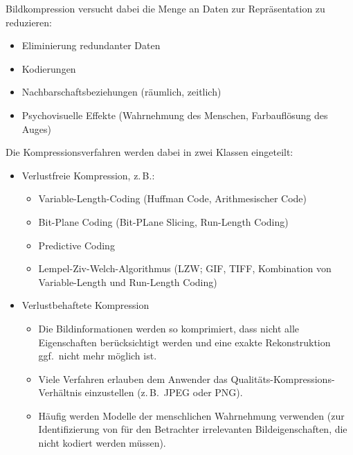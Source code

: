 \documentclass[a4paper, 11pt, accentcolor = tud3b]{tudreport}
\newcommand{\zB}{z.\,B.~}
\newcommand{\ggf}{ggf.~}
\begin{document}
			Bildkompression versucht dabei die Menge an Daten zur Repräsentation zu reduzieren:
			\begin{itemize}
				\item Eliminierung redundanter Daten
				\item Kodierungen
				\item Nachbarschaftsbeziehungen (räumlich, zeitlich)
				\item Psychovisuelle Effekte (Wahrnehmung des Menschen, Farbauflösung des Auges)
			\end{itemize}
			Die Kompressionsverfahren werden dabei in zwei Klassen eingeteilt:
			\begin{itemize}
				\item Verlustfreie Kompression, z.\,B.:
					\begin{itemize}
						\item Variable-Length-Coding (Huffman Code, Arithmesischer Code)
						\item Bit-Plane Coding (Bit-PLane Slicing, Run-Length Coding)
						\item Predictive Coding
						\item Lempel-Ziv-Welch-Algorithmus (LZW; GIF, TIFF, Kombination von Variable-Length und Run-Length Coding)
					\end{itemize}
				\item Verlustbehaftete Kompression
					\begin{itemize}
						\item Die Bildinformationen werden so komprimiert, dass nicht alle Eigenschaften berücksichtigt werden und eine exakte Rekonstruktion \ggf nicht mehr möglich ist.
						\item Viele Verfahren erlauben dem Anwender das Qualitäts-Kompressions-Verhältnis einzustellen (\zB JPEG oder PNG).
						\item Häufig werden Modelle der menschlichen Wahrnehmung verwenden (zur Identifizierung von für den Betrachter irrelevanten Bildeigenschaften, die nicht kodiert werden müssen).
					\end{itemize}
			\end{itemize}
		
\end{document}
